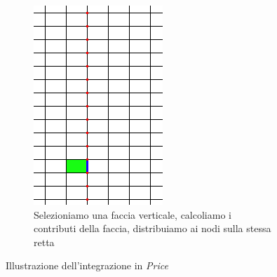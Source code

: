 \documentclass[a4paper,10pt]{report}
\theoremstyle{plain}
\theoremstyle{definition}
\theoremstyle{remark}
\begin{document}
\begin{figure}[p]
\begin{subfigure}[t]{.48\linewidth}
 \includegraphics[width=.85\linewidth]{img/Integrating_on_y}
 \caption{Selezioniamo una faccia verticale, calcoliamo i contributi della faccia, distribuiamo ai nodi sulla stessa retta}
 \label{fig:integrating_y}
 \vspace{4ex}
 \end{subfigure}
 \caption{Illustrazione dell'integrazione in \emph{Price}}
 \label{fig:dummy}
\end{figure}
\end{document}
